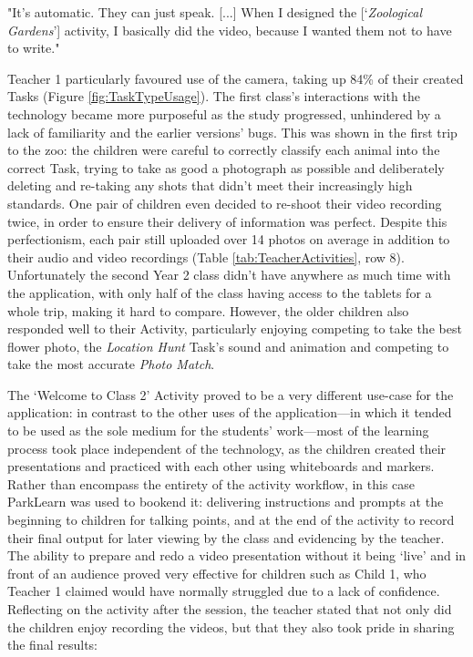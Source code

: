 \begin{displayquote}
"It’s automatic. They can just speak. [...] When I designed the [‘\textit{Zoological Gardens}’] activity, I basically did the video, because I wanted them not to have to write."
\end{displayquote}

Teacher 1 particularly favoured use of the camera, taking up 84\% of their created Tasks (Figure \ref{fig:TaskTypeUsage}). The first class's interactions with the technology became more purposeful as the study progressed, unhindered by a lack of familiarity and the earlier versions' bugs. This was shown in the first trip to the zoo: the children were careful to correctly classify each animal into the correct Task, trying to take as good a photograph as possible and deliberately deleting and re-taking any shots that didn't meet their increasingly high standards. One pair of children even decided to re-shoot their video recording twice, in order to ensure their delivery of information was perfect. Despite this perfectionism, each pair still uploaded over 14 photos on average in addition to their audio and video recordings (Table \ref{tab:TeacherActivities}, row 8). Unfortunately the second Year 2 class didn't have anywhere as much time with the application, with only half of the class having access to the tablets for a whole trip, making it hard to compare. However, the older children also responded well to their Activity, particularly enjoying competing to take the best flower photo, the \textit{Location Hunt} Task’s sound and animation and competing to take the most accurate \textit{Photo Match}.

The `Welcome to Class 2' Activity proved to be a very different use-case for the application: in contrast to the other uses of the application---in which it tended to be used as the sole medium for the students' work---most of the learning process took place independent of the technology, as the children created their presentations and practiced with each other using whiteboards and markers. Rather than encompass the entirety of the activity workflow, in this case ParkLearn was used to bookend it: delivering instructions and prompts at the beginning to children for talking points, and at the end of the activity to record their final output for later viewing by the class and evidencing by the teacher. The ability to prepare and redo a video presentation without it being `live' and in front of an audience proved very effective for children such as Child 1, who Teacher 1 claimed would have normally struggled due to a lack of confidence. Reflecting on the activity after the session, the teacher stated that not only did the children enjoy recording the videos, but that they also took pride in sharing the final results: 

